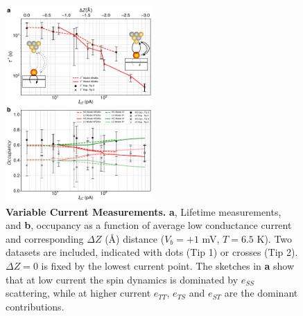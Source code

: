 \documentclass[
reprint,amsmath,amssymb,aps]{revtex4-2}
\begin{document}
\begin{figure}[h!]
\includegraphics[width=0.5\textwidth]{fig5_final_v3.pdf}
\caption{\textbf{Variable Current Measurements.} \textbf{a}, Lifetime measurements, and \textbf{b}, occupancy as a function of average low conductance current and corresponding $\Delta Z$ (\AA) distance ($V_{b} = +1$ mV, $T = 6.5$ K). Two datasets are included, indicated with dots (Tip 1) or crosses (Tip 2). $\Delta Z = 0$ is fixed by the lowest current point. The sketches in \textbf{a} show that  at low current the spin dynamics is dominated by $e_{SS}$ scattering, while at higher current $e_{TT}$, $e_{TS}$ and $e_{ST}$ are the dominant contributions. 
\label{fig:current} }
\end{figure}
\end{document}
